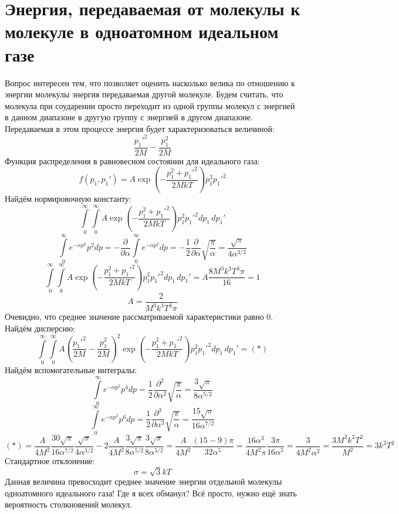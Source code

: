 \section{Энергия, передаваемая от молекулы к молекуле в одноатомном идеальном газе}

Вопрос интересен тем, что позволяет оценить насколько велика по отношению к энергии молекулы энергия передаваемая другой молекуле. Будем считать, что молекула при соударении просто переходит из одной группы молекул с энергией в данном диапазоне в другую группу с энергией в другом диапазоне. Передаваемая в этом процессе энергия будет характеризоваться величиной:
\[
	\frac{p_1'^2}{2M} - \frac{p_1^2}{2M}
\] 
Функция распределения в равновесном состоянии для идеального газа:
\[
	f(p_1, p_1') = 
	A \exp \left(
	- \frac{p_1^2 + p_1'^2}{2MkT}
	\right)	p_1^2 p_1'^2
\]
Найдём нормировочную константу:
\[
	\int\limits_0^\infty \! \int\limits_0^\infty 
	A \exp \left(
	- \frac{p_1^2 + p_1'^2}{2MkT}
	\right)	p_1^2 p_1'^2 dp_1\,dp_1'
\]
\[
	\int\limits_0^\infty e^{- \alpha p^2} p^2 dp = 
	- \frac{\partial}{\partial \alpha} \int\limits_0^\infty e^{- \alpha p^2} dp
	= - \frac{1}{2} \frac{\partial}{\partial \alpha} \sqrt{\frac{\pi}{\alpha}}
	= \frac{\sqrt{\pi}}{4\alpha^{3/2}}
\]
\[
	\int\limits_0^\infty \! \int\limits_0^\infty 
	A \exp \left(
	- \frac{p_1^2 + p_1'^2}{2MkT}
	\right)	p_1^2 p_1'^2 dp_1\,dp_1'
	=
	A \frac{8M^3k^3T^3\pi}{16} = 1
\]
\[
	A = \frac{2}{M^3k^3T^3\pi}
\]
Очевидно, что среднее значение рассматриваемой характеристики равно 0. Найдём дисперсию:
\[
	\int\limits_0^\infty \! \int\limits_0^\infty 
	A \left(\frac{p_1'^2}{2M} - \frac{p_1^2}{2M}\right)^2\exp \left(
	- \frac{p_1^2 + p_1'^2}{2MkT}
	\right)	p_1^2 p_1'^2 dp_1\,dp_1' = (*)
\]
Найдём вспомогательные интегралы:
\[
	\int\limits_0^\infty e^{- \alpha p^2} p^4 dp = 
	\frac{1}{2} \frac{\partial^2}{\partial \alpha^2} \sqrt{\frac{\pi}{\alpha}} =
	\frac{3\sqrt{\pi}}{8\alpha^{5/2}}
\]
\[
	\int\limits_0^\infty e^{- \alpha p^2} p^6 dp = 
	\frac{1}{2} \frac{\partial^3}{\partial \alpha^3} \sqrt{\frac{\pi}{\alpha}} =
	\frac{15\sqrt{\pi}}{16\alpha^{7/2}}
\]
\[
	(*) = \frac{A}{4M^2} \frac{30\sqrt{\pi}}{16\alpha^{7/2}} \frac{\sqrt{\pi}}{4\alpha^{3/2}} -
	2\frac{A}{4M^2} \frac{3\sqrt{\pi}}{8\alpha^{5/2}}\frac{3\sqrt{\pi}}{8\alpha^{5/2}}
	=
	\frac{A}{4M^2}  \frac{(15 - 9)\pi}{32\alpha^{5}} = 
	\frac{16\alpha^{3}}{4M^2\pi} \frac{3\pi}{16\alpha^{5}} =
	\frac{3}{4M^2\alpha^{2}} = 
	\frac{3M^2k^2T^2}{M^2} = 3 k^2 T^2
\]
Стандартное отклонение:
\[
	\sigma = \sqrt{3} kT
\]
Данная величина превосходит среднее значение энергии отдельной молекулы одноатомного идеального газа! Где я всех обманул? Всё просто, нужно ещё знать вероятность столкновений молекул.